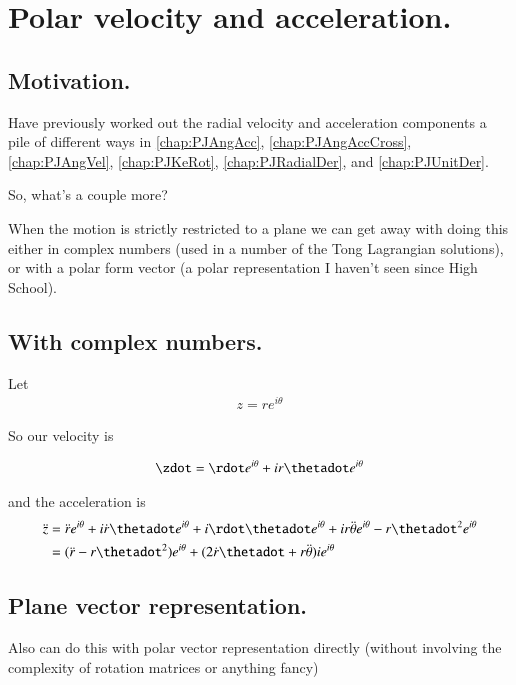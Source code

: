 \chapter{Polar velocity and acceleration.}

\section{Motivation. }

Have previously worked out the radial velocity and acceleration components a pile of different ways in
\ref{chap:PJAngAcc}, 
\ref{chap:PJAngAccCross}, 
\ref{chap:PJAngVel}, 
\ref{chap:PJKeRot}, 
\ref{chap:PJRadialDer}, and
\ref{chap:PJUnitDer}.

So, what's a couple more?

When the motion is strictly restricted to a plane we can get away with doing this either in complex numbers
(used in a number of the Tong Lagrangian solutions), or with a polar form  vector (a polar representation
I haven't seen since High School).

\section{With complex numbers. }

Let
\begin{align*}
z = r e^{i\theta}
\end{align*}

So our velocity is

\begin{align*}
\zdot = \rdot e^{i\theta} + i r \thetadot e^{i\theta}
\end{align*}

and the acceleration is
\begin{align*}
\ddot{z}
&= \ddot{r} e^{i\theta} + i \dot{r} \thetadot e^{i\theta}
 + i \rdot \thetadot e^{i\theta}
 + i r \ddot{\theta} e^{i\theta}
 - r \thetadot^2 e^{i\theta} \\
&= (\ddot{r} - r \thetadot^2 ) e^{i\theta} + (2 \dot{r} \thetadot + r \ddot{\theta} ) i e^{i\theta}
\end{align*}

\section{Plane vector representation. }

Also can do this with polar vector representation directly (without involving the complexity of rotation matrices or anything fancy)

